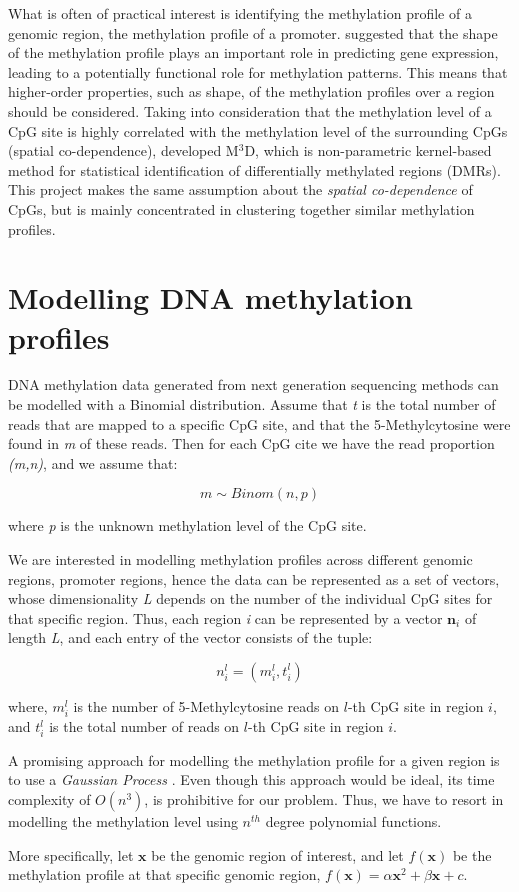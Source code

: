 What is often of practical interest is identifying the methylation profile of a genomic region, \eg the methylation profile of a promoter. \cite{Vanderkraats2013} suggested that the shape of the methylation profile plays an important role in predicting gene expression, leading to a potentially functional role for methylation patterns. This means that higher-order properties, such as shape, of the methylation profiles over a region should be considered. Taking into consideration that the methylation level of a CpG site is highly correlated with the methylation level of the surrounding CpGs (\ie spatial co-dependence), \cite{Mayo2014} developed M$^3$D, which is non-parametric kernel-based method for statistical identification of differentially methylated regions (DMRs). This project makes the same assumption about the \emph{spatial co-dependence} of CpGs, but is mainly concentrated in clustering together similar methylation profiles.

\section{Modelling DNA methylation profiles}
DNA methylation data generated from next generation sequencing methods can be modelled with a Binomial distribution. Assume that \emph{t} is the total number of reads that are mapped to a specific CpG site, and that the 5-Methylcytosine were found in \emph{m} of these reads. Then for each CpG cite we have the read proportion \emph{(m,n)}, and we assume that:

\begin{equation}
	m \sim Binom(n, p)
\end{equation}

where \emph{p} is the unknown methylation level of the CpG site.

We are interested in modelling methylation profiles across different genomic regions, \eg promoter regions, hence the data can be represented as a set of vectors, whose dimensionality \emph{L} depends on the number of the individual CpG sites for that specific region. Thus, each region \emph{i} can be represented by a vector $\mathbf{n}_{i}$ of length \emph{L}, and each entry of the vector consists of the tuple:

\begin{equation}
	n_{i}^{l} = (m_{i}^{l},t_{i}^{l})
\end{equation}

where, $m_{i}^{l}$ is the number of 5-Methylcytosine reads on $l$-th CpG site in region $i$, and $t_{i}^{l}$ is the total number of reads on $l$-th CpG site in region $i$.

A promising approach for modelling the methylation profile for a given region is to use a \emph{Gaussian Process} \citep{Rasmussen2006}. Even though this approach would be ideal, its time complexity of $O(n^{3})$, is prohibitive for our problem. Thus, we have to resort in modelling the methylation level using $n^{th}$ degree polynomial functions.

More specifically, let $\mathbf{x}$ be the genomic region of interest, and let $f(\mathbf{x})$ be the methylation profile at that specific genomic region, \eg $f(\mathbf{x}) = \alpha \mathbf{x}^{2} + \beta \mathbf{x} + c$.